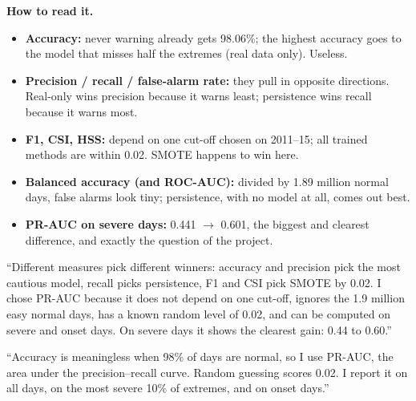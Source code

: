 \noindent\textbf{How to read it.}
\begin{itemize}
  \item \textbf{Accuracy:} never warning already gets 98.06\%; the highest accuracy goes to the model that misses half
        the extremes (real data only). Useless.
  \item \textbf{Precision / recall / false-alarm rate:} they pull in opposite directions. Real-only wins precision
        because it warns least; persistence wins recall because it warns most.
  \item \textbf{F1, CSI, HSS:} depend on one cut-off chosen on 2011--15; all trained methods are within 0.02. SMOTE
        happens to win here.
  \item \textbf{Balanced accuracy (and ROC-AUC):} divided by 1.89 million normal days, false alarms look tiny;
        persistence, with no model at all, comes out best.
  \item \textbf{PR-AUC on severe days:} 0.441 $\rightarrow$ 0.601, the biggest and clearest difference, and exactly the
        question of the project.
\end{itemize}

\begin{sayit}
``Different measures pick different winners: accuracy and precision pick the most cautious model, recall picks
persistence, F1 and CSI pick SMOTE by 0.02. I chose PR-AUC because it does not depend on one cut-off, ignores the
1.9 million easy normal days, has a known random level of 0.02, and can be computed on severe and onset days. On severe
days it shows the clearest gain: 0.44 to 0.60.''
\end{sayit}

\begin{sayit}
``Accuracy is meaningless when 98\% of days are normal, so I use PR-AUC, the area under the precision--recall curve.
Random guessing scores 0.02. I report it on all days, on the most severe 10\% of extremes, and on onset days.''
\end{sayit}
